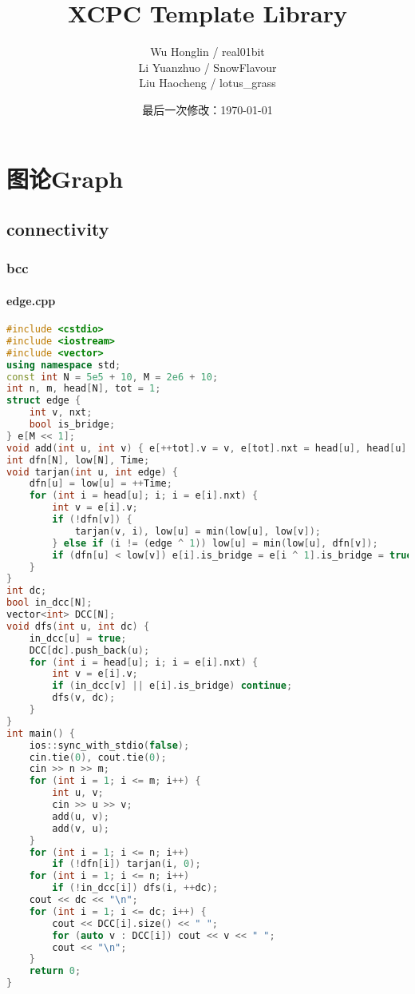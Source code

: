 \documentclass[9pt, a4paper, oneside]{book}
\title{\Huge XCPC Template Library}
\author{
    Wu Honglin / real01bit \\
    Li Yuanzhuo / SnowFlavour \\
    Liu Haocheng / lotus\_grass \\
}
\date{最后一次修改：\today}
\begin{document}
\maketitle
\tableofcontents
\chapter{图论Graph}
\section{connectivity}
\subsection{bcc}
\subsubsection{edge.cpp}
\begin{lstlisting}[language={C++}]
#include <cstdio>
#include <iostream>
#include <vector>
using namespace std;
const int N = 5e5 + 10, M = 2e6 + 10;
int n, m, head[N], tot = 1;
struct edge {
    int v, nxt;
    bool is_bridge;
} e[M << 1];
void add(int u, int v) { e[++tot].v = v, e[tot].nxt = head[u], head[u] = tot; }
int dfn[N], low[N], Time;
void tarjan(int u, int edge) {
    dfn[u] = low[u] = ++Time;
    for (int i = head[u]; i; i = e[i].nxt) {
        int v = e[i].v;
        if (!dfn[v]) {
            tarjan(v, i), low[u] = min(low[u], low[v]);
        } else if (i != (edge ^ 1)) low[u] = min(low[u], dfn[v]);
        if (dfn[u] < low[v]) e[i].is_bridge = e[i ^ 1].is_bridge = true;
    }
}
int dc;
bool in_dcc[N];
vector<int> DCC[N];
void dfs(int u, int dc) {
    in_dcc[u] = true;
    DCC[dc].push_back(u);
    for (int i = head[u]; i; i = e[i].nxt) {
        int v = e[i].v;
        if (in_dcc[v] || e[i].is_bridge) continue;
        dfs(v, dc);
    }
}
int main() {
    ios::sync_with_stdio(false);
    cin.tie(0), cout.tie(0);
    cin >> n >> m;
    for (int i = 1; i <= m; i++) {
        int u, v;
        cin >> u >> v;
        add(u, v);
        add(v, u);
    }
    for (int i = 1; i <= n; i++)
        if (!dfn[i]) tarjan(i, 0);
    for (int i = 1; i <= n; i++)
        if (!in_dcc[i]) dfs(i, ++dc);
    cout << dc << "\n";
    for (int i = 1; i <= dc; i++) {
        cout << DCC[i].size() << " ";
        for (auto v : DCC[i]) cout << v << " ";
        cout << "\n";
    }
    return 0;
}\end{lstlisting}
\end{document}
